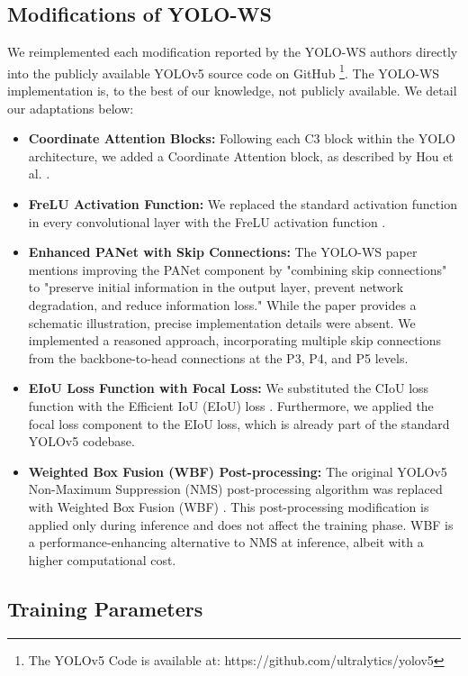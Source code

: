 \documentclass[conference]{IEEEtran}
\begin{document}
\subsection{Modifications of YOLO-WS}

We reimplemented each modification reported by the YOLO-WS authors directly into the publicly available YOLOv5 source code on GitHub \footnote{The YOLOv5 Code is available at: https://github.com/ultralytics/yolov5}. The YOLO-WS implementation is, to the best of our knowledge, not publicly available. We detail our adaptations below:

\begin{itemize}
    \item \textbf{Coordinate Attention Blocks:} Following each C3 block within the YOLO architecture, we added a Coordinate Attention block, as described by Hou et al. \cite{coordatt}.
    \item \textbf{FreLU Activation Function:}  We replaced the standard activation function in every convolutional layer with the FreLU activation function \cite{frelu}.
    \item \textbf{Enhanced PANet with Skip Connections:} The YOLO-WS paper mentions improving the PANet component by "combining skip connections" to "preserve initial information in the output layer, prevent network degradation, and reduce information loss." While the paper provides a schematic illustration, precise implementation details were absent. We implemented a reasoned approach, incorporating multiple skip connections from the backbone-to-head connections at the P3, P4, and P5 levels.
    \item \textbf{EIoU Loss Function with Focal Loss:}  We substituted the CIoU loss function with the Efficient IoU (EIoU) loss \cite{feiou}.  Furthermore, we applied the focal loss component to the EIoU loss, which is already part of the standard YOLOv5 codebase.
    \item \textbf{Weighted Box Fusion (WBF) Post-processing:} The original YOLOv5 Non-Maximum Suppression (NMS) post-processing algorithm was replaced with Weighted Box Fusion (WBF) \cite{wbf}. This post-processing modification is applied only during inference and does not affect the training phase. WBF is a performance-enhancing alternative to NMS at inference, albeit with a higher computational cost.
\end{itemize}

\subsection{Training Parameters}
\end{document}
